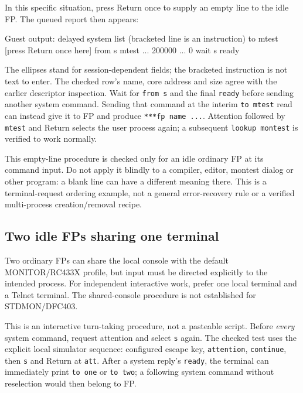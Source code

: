 In this specific situation, press Return once to supply an empty line to the idle FP. The queued report then appears:

\begin{commandexample}{Guest output: delayed system list (bracketed line is an instruction)}
to mtest
                         [press Return once here]
from s
mtest         ...        200000   ...   0    wait   s
ready
\end{commandexample}

The ellipses stand for session-dependent fields; the bracketed instruction is not text to enter. The checked row's name, core address and size agree with the earlier descriptor inspection. Wait for \passthrough{\lstinline!from s!} and the final \passthrough{\lstinline!ready!} before sending another system command. Sending that command at the interim \passthrough{\lstinline!to mtest!} read can instead give it to FP and produce \passthrough{\lstinline!***fp name ...!}. Attention followed by \passthrough{\lstinline!mtest!} and Return selects the user process again; a subsequent \passthrough{\lstinline!lookup montest!} is verified to work normally.

This empty-line procedure is checked only for an idle ordinary FP at its command input. Do not apply it blindly to a compiler, editor, montest dialog or other program: a blank line can have a different meaning there. This is a terminal-request ordering example, not a general error-recovery rule or a verified multi-process creation/removal recipe.

\subsection{Two idle FPs sharing one terminal}\label{two-idle-fps-sharing-one-terminal}

Two ordinary FPs can share the local console with the default MONITOR/RC433X
profile, but input must be directed explicitly to the intended process.
For independent interactive work, prefer one local terminal and a Telnet
terminal. The shared-console procedure is not established for STDMON/DFC403.

This is an interactive turn-taking procedure, not a pasteable script. Before \emph{every} system command, request attention and select \passthrough{\lstinline!s!} again. The checked test uses the explicit local simulator sequence: configured escape key, \passthrough{\lstinline!attention!}, \passthrough{\lstinline!continue!}, then \passthrough{\lstinline!s!} and Return at \passthrough{\lstinline!att!}. After a system reply's \passthrough{\lstinline!ready!}, the terminal can immediately print \passthrough{\lstinline!to one!} or \passthrough{\lstinline!to two!}; a following system command without reselection would then belong to FP.

